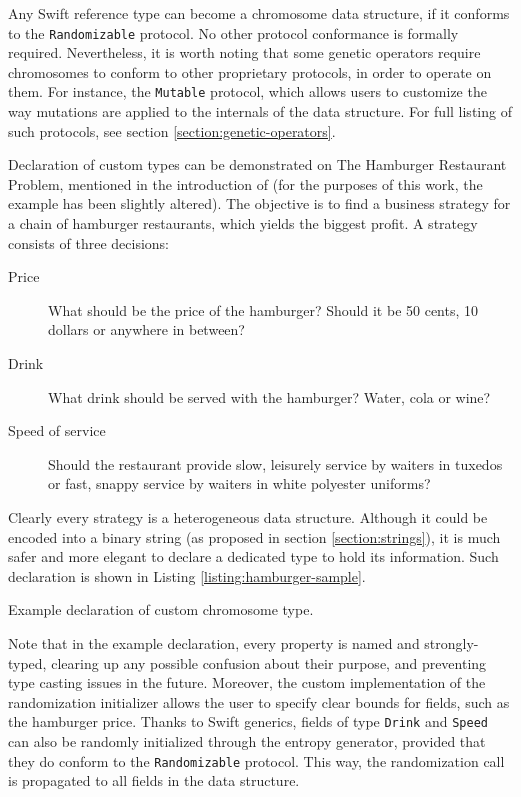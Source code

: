 Any Swift reference type can become a chromosome data structure, if it conforms to the \texttt{Randomizable} protocol. No other protocol conformance is formally required. Nevertheless, it is worth noting that some genetic operators require chromosomes to conform to other proprietary protocols, in order to operate on them. For instance, the \texttt{Mutable} protocol, which allows users to customize the way mutations are applied to the internals of the data structure. For full listing of such protocols, see section \ref{section:genetic-operators}.

Declaration of custom types can be demonstrated on The Hamburger Restaurant Problem, mentioned in the introduction of \cite{Koza1992} (for the purposes of this work, the example has been slightly altered). The objective is to find a business strategy for a chain of hamburger restaurants, which yields the biggest profit. A strategy consists of three decisions:
~
\begin{description}
	\item[Price]
	What should be the price of the hamburger? Should it be 50 cents, 10 dollars or anywhere in between?

	\item[Drink]
	What drink should be served with the hamburger? Water, cola or wine?

	\item[Speed of service]
	Should the restaurant provide slow, leisurely service by waiters in tuxedos or fast, snappy service by waiters in white polyester uniforms?
\end{description}

Clearly every strategy is a heterogeneous data structure. Although it could be encoded into a binary string (as proposed in section \ref{section:strings}), it is much safer and more elegant to declare a dedicated type to hold its information. Such declaration is shown in Listing \ref{listing:hamburger-sample}.

\begin{listing}[ht]
	\caption{Example declaration of custom chromosome type.}
	\label{listing:hamburger-sample}
\end{listing}

Note that in the example declaration, every property is named and strongly-typed, clearing up any possible confusion about their purpose, and preventing type casting issues in the future. Moreover, the custom implementation of the randomization initializer allows the user to specify clear bounds for fields, such as the hamburger price. Thanks to Swift generics, fields of type \texttt{Drink} and \texttt{Speed} can also be randomly initialized through the entropy generator, provided that they do conform to the \texttt{Randomizable} protocol. This way, the randomization call is propagated to all fields in the data structure.

